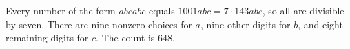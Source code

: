 Every number of the form $\overline{abcabc}$ equals $1001\overline{abc}=7\cdot143\overline{abc}$, so all are divisible by seven. There are nine nonzero choices for $a$, nine other digits for $b$, and eight remaining digits for $c$. The count is $\boxed{648}$.

